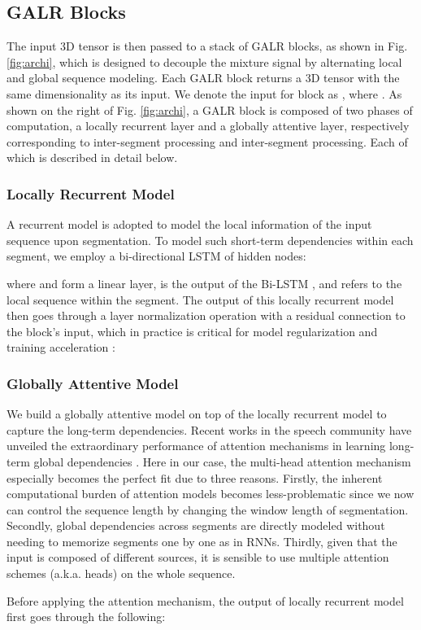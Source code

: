 \documentclass{article}
\begin{document}
\subsection{GALR Blocks}
The input 3D tensor  is then passed to a stack of  GALR blocks, as shown in Fig. \ref{fig:archi}, which is designed to decouple the mixture signal by alternating local and global sequence modeling. Each GALR block returns a 3D tensor with the same dimensionality as its input. We denote the input for block  as , where . As shown on the right of Fig. \ref{fig:archi}, a GALR block is composed of two phases of computation, a locally recurrent layer and a globally attentive layer, respectively corresponding to inter-segment processing and inter-segment processing. Each of which is described in detail below.

\subsubsection{Locally Recurrent Model}
A recurrent model is adopted to model the local information of the input sequence upon segmentation. To model such short-term dependencies within each segment, we employ a bi-directional LSTM of  hidden nodes:

where  and  form a linear layer,  is the output of the Bi-LSTM , and  refers to the local sequence within the  segment. The output of this locally recurrent model then goes through a layer normalization operation  with a residual connection to the block's input, which in practice is critical for model regularization and training acceleration \cite{luo2019dual}:

\subsubsection{Globally Attentive Model}
We build a globally attentive model on top of the locally recurrent model to capture the long-term dependencies. Recent works in the speech community \cite{dong2018speech, li2019neural, ren2019fastspeech} have unveiled the extraordinary performance of attention mechanisms in learning long-term global dependencies \cite{vaswani2017attention}. Here in our case, the multi-head attention mechanism especially becomes the perfect fit due to three reasons. Firstly, the inherent computational burden of attention models becomes less-problematic since we now can control the sequence length by changing the window length of segmentation. Secondly, global dependencies across segments are directly modeled without needing to memorize segments one by one as in RNNs. Thirdly, given that the input is composed of different sources, it is sensible to use multiple attention schemes (a.k.a. heads) on the whole sequence.
\par
Before applying the attention mechanism, the output of locally recurrent model first goes through the following:
\end{document}
